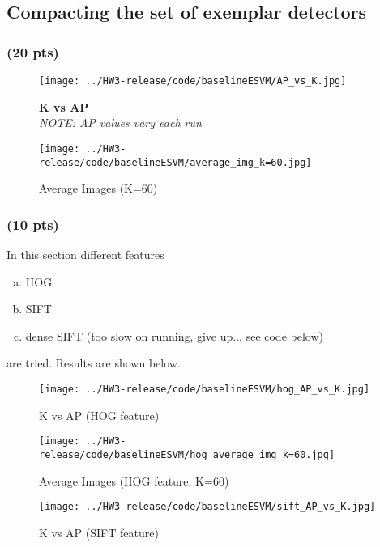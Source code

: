 \documentclass[12pt]{article}
\newcounter{list}
\begin{document}
\subsection{Compacting the set of exemplar detectors}

\subsubsection{(20 pts)}
\label{filtbank}

\begin{figure}[H]
  \centering \texttt{[image: ../HW3-release/code/baselineESVM/AP\_vs\_K.jpg]}
  \caption{{\bf K vs AP} \\ 
  {\it NOTE: AP values vary each run}}
  \label{fig:k_vs_ap}
\end{figure}

\begin{figure}[H]
  \centering \texttt{[image: ../HW3-release/code/baselineESVM/average\_img\_k=60.jpg]}
  \caption{Average Images (K=60)}
  \label{fig:ave_img_k60}
\end{figure}



\subsubsection{(10 pts)}

In this section different features
\begin{enumerate}[(a)]
\item HOG
\item SIFT
\item dense SIFT (too slow on running, give up... see code below)
\end{enumerate}
are tried. Results are shown below.

\begin{figure}[H]
  \centering \texttt{[image: ../HW3-release/code/baselineESVM/hog\_AP\_vs\_K.jpg]}
  \caption{K vs AP (HOG feature)}
\end{figure}

\begin{figure}[H]
  \centering \texttt{[image: ../HW3-release/code/baselineESVM/hog\_average\_img\_k=60.jpg]}
  \caption{Average Images (HOG feature, K=60)}
\end{figure}

\begin{figure}[H]
  \centering \texttt{[image: ../HW3-release/code/baselineESVM/sift\_AP\_vs\_K.jpg]}
  \caption{K vs AP (SIFT feature)}
\end{figure}
\end{document}
